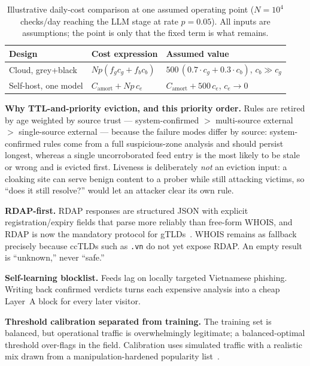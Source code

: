 \documentclass[conference]{IEEEtran}
\begin{document}
\begin{table}[t]
\centering
\caption{Illustrative daily-cost comparison at one assumed operating point
($N=10^4$ checks/day reaching the LLM stage at rate $p=0.05$). All inputs are
assumptions; the point is only that the fixed term is what remains.}
\label{tab:cost}
\footnotesize
\begin{tabular}{@{}lll@{}}
\toprule
Design & Cost expression & Assumed value \\
\midrule
Cloud, grey+black & $Np(f_g c_g + f_b c_b)$ & $500\,(0.7{\cdot}c_g + 0.3{\cdot}c_b)$, $c_b\!\gg\!c_g$ \\
Self-host, one model & $C_\text{amort} + Np\,c_e$ & $C_\text{amort} + 500\,c_e$, $c_e\!\to\!0$ \\
\bottomrule
\end{tabular}
\end{table}

\textbf{Why TTL-and-priority eviction, and this priority order.} Rules are retired
by age weighted by source trust --- system-confirmed $>$ multi-source external $>$
single-source external --- because the failure modes differ by source:
system-confirmed rules come from a full suspicious-zone analysis and should
persist longest, whereas a single uncorroborated feed entry is the most likely to
be stale or wrong and is evicted first. Liveness is deliberately \emph{not} an
eviction input: a cloaking site can serve benign content to a prober while still
attacking victims, so ``does it still resolve?'' would let an attacker clear its
own rule.

\textbf{RDAP-first.} RDAP responses are structured JSON with explicit
registration/expiry fields that parse more reliably than free-form WHOIS, and
RDAP is now the mandatory protocol for gTLDs~\cite{rfc9082,rfc9083,rfc9224,
icann_rdap}. WHOIS remains as fallback precisely because ccTLDs such as
\texttt{.vn} do not yet expose RDAP. An empty result is ``unknown,'' never
``safe.''

\textbf{Self-learning blocklist.} Feeds lag on locally targeted Vietnamese
phishing. Writing back confirmed verdicts turns each expensive analysis into a
cheap Layer~A block for every later visitor.

\textbf{Threshold calibration separated from training.} The training set is
balanced, but operational traffic is overwhelmingly legitimate; a
balanced-optimal threshold over-flags in the field. Calibration uses simulated
traffic with a realistic mix drawn from a manipulation-hardened popularity
list~\cite{lepochat2019tranco}.
\end{document}
